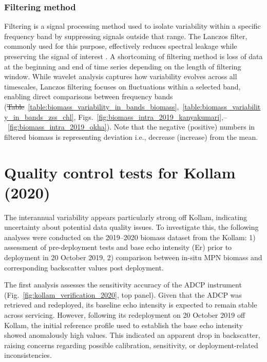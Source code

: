 \documentclass[12pt,a4paper]{article}
\providecommand{\DIFaddtex}[1]{{\protect\color{blue}\uwave{#1}}} %
\providecommand{\DIFdeltex}[1]{{\protect\color{red}\sout{#1}}}                      %
\providecommand{\DIFaddbegin}{} %
\providecommand{\DIFaddend}{} %
\providecommand{\DIFdelbegin}{} %
\providecommand{\DIFdelend}{} %
\providecommand{\DIFadd}[1]{\texorpdfstring{\DIFaddtex{#1}}{#1}} %
\providecommand{\DIFdel}[1]{\texorpdfstring{\DIFdeltex{#1}}{}} %
\newcommand{\DIFscaledelfig}{0.5}
\newlength{\DIFdelgraphicswidth} %
\newlength{\DIFdelgraphicsheight} %
\newcommand{\DIFaddincludegraphics}[2][]{{\color{blue}\fbox{\DIFOincludegraphics[#1]{#2}}}} %
\newcommand{\DIFdelincludegraphics}[2][]{%
\sbox{\DIFdelgraphicsbox}{\DIFOincludegraphics[#1]{#2}}%
\settoboxwidth{\DIFdelgraphicswidth}{\DIFdelgraphicsbox} %
\settoboxtotalheight{\DIFdelgraphicsheight}{\DIFdelgraphicsbox} %
\scalebox{\DIFscaledelfig}{%
\parbox[b]{\DIFdelgraphicswidth}{\usebox{\DIFdelgraphicsbox}\\[-\baselineskip] \rule{\DIFdelgraphicswidth}{0em}}\llap{\resizebox{\DIFdelgraphicswidth}{\DIFdelgraphicsheight}{%
\setlength{\unitlength}{\DIFdelgraphicswidth}%
\begin{picture}(1,1)%
\thicklines\linethickness{2pt} %
{\color[rgb]{1,0,0}\put(0,0){\framebox(1,1){}}}%
{\color[rgb]{1,0,0}\put(0,0){\line( 1,1){1}}}%
{\color[rgb]{1,0,0}\put(0,1){\line(1,-1){1}}}%
\end{picture}%
}\hspace*{3pt}}} %
} %
\DeclareRobustCommand{\DIFaddbegin}{\DIFOaddbegin \let\includegraphics\DIFaddincludegraphics} %
\DeclareRobustCommand{\DIFaddend}{\DIFOaddend \let\includegraphics\DIFOincludegraphics} %
\DeclareRobustCommand{\DIFdelbegin}{\DIFOdelbegin \let\includegraphics\DIFdelincludegraphics} %
\DeclareRobustCommand{\DIFdelend}{\DIFOaddend \let\includegraphics\DIFOincludegraphics} %
\begin{document}
\subsubsection{Filtering method}
\label{sec:filtering_method}
Filtering is a signal processing method used to isolate variability within a specific frequency band by suppressing signals outside that range. The Lanczos filter, commonly used for this purpose, effectively reduces spectral leakage while preserving the signal of interest \citep{duchon1979lanczos}. A shortcoming of filtering method is loss of data at the beginning and end of time series depending on the length of filtering window. While wavelet analysis captures how variability evolves across all timescales, Lanczos filtering focuses on fluctuations within a selected band, enabling direct comparisons between frequency bands (\DIFdelbegin \DIFdel{Table}\DIFdelend \DIFaddbegin \DIFadd{table}\DIFaddend ~\ref{table:biomass_variability_in_bands_biomass},~\ref{table:biomass_variability_in_bands_zss_chl}, Figs.~\ref{fig:biomass_intra_2019_kanyakumari},--~\ref{fig:biomass_intra_2019_okha}). Note that the negative (positive) numbers in filtered biomass is representing deviation i.e., decrease (increase) from the mean. 


\section{Quality control tests for Kollam (2020)}
\label{sec:QC_kollam}
The interannual variability appears particularly strong off Kollam, indicating uncertainty  about potential data quality issues. To investigate this, the following analyses were conducted on the 2019--2020 biomass dataset from the Kollam: 1) assessment of pre-deployment tests and base echo intensity (Er) prior to deployment in 20 October 2019, 2) comparison between in-situ MPN biomass and corresponding backscatter values post deployment. 

The first analysis assesses the sensitivity accuracy of the ADCP instrument (Fig.~\ref{fig:kollam_verification_2020}, top panel). Given that the ADCP was retrieved and redeployed, its baseline echo intensity is expected to remain stable across servicing. However, following its redeployment on 20 October 2019 off Kollam, the initial reference profile used to establish the base echo intensity showed anomalously high values. This indicated an apparent drop in backscatter, raising concerns regarding possible calibration, sensitivity, or deployment-related inconsistencies.
\end{document}
